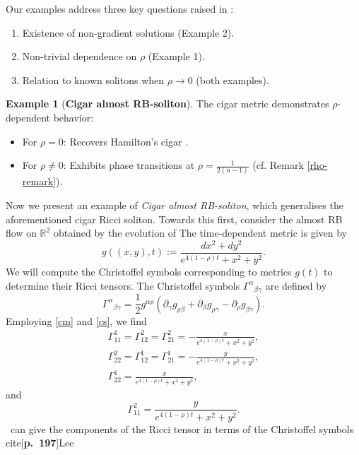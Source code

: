 \documentclass[a4paper, twoside, 10pt]{article}
\numberwithin{equation}{section}
\theoremstyle{definition}
\newtheorem{example}{Example}[section]
\begin{document}
Our examples address three key questions raised in \cite{feitosa2019gradient}:
\begin{enumerate}
    \item Existence of non-gradient solutions (Example 2).
    \item Non-trivial dependence on $\rho$ (Example 1).
    \item Relation to known solitons when $\rho\to 0$ (both examples).
\end{enumerate}

\smallskip

\begin{example}[{\bf Cigar almost RB-soliton}]\label{ex:cigar}
The cigar metric demonstrates $\rho$-dependent behavior:
\begin{itemize}
    \item For $\rho=0$: Recovers Hamilton's cigar \cite{PT}.
    \item For $\rho\neq0$: Exhibits phase transitions at $\rho = \frac{1}{2(n-1)}$ (cf. Remark \ref{rho-remark}).
\end{itemize}
Now we present an example of {\it Cigar almost RB-soliton}, which generalises the aforementioned cigar Ricci soliton. Towards this first, consider the  almost RB flow  on $\mathbb{R}^2$ obtained by the evolution of 
The time-dependent metric is given by 
     \begin{equation}\label{cm}
         g((x,y),t):=\frac{dx^2+dy^2}{e^{4(1-\rho)t}+x^2+y^2}.
     \end{equation}
We will compute the Christoffel symbols corresponding to metrics $g(t)$ to determine their Ricci tensors. The Christoffel symbols $\Gamma^\alpha{ }_{\beta \gamma}$ are defined by
     \begin{equation}\label{cs}
         \Gamma^\alpha{ }_{\beta \gamma}=\frac{1}{2} g^{\alpha \rho}\left(\partial_\gamma g_{\rho \beta}+\partial_\beta g_{\rho \gamma}-\partial_\rho g_{\beta \gamma}\right).
     \end{equation}
Employing  \eqref{cm} and \eqref{cs}, we find   
   $$  \begin{gathered}
\Gamma_{11}^1=\Gamma_{1 2}^2=\Gamma_{2 1}^2=-\frac{x}{e^{4(1-\rho) t}+x^2+y^2}, \\
\Gamma_{2 2}^2=\Gamma_{1 2}^1=\Gamma_{2 1}^1=-\frac{y}{e^{4(1-\rho) t}+x^2+y^2}, \\
\Gamma^{1 }_{2 2}=\frac{x}{e^{4 (1-\rho)t}+x^2+y^2},
\end{gathered}
$$
and $$\Gamma^{2 }_{1 1}=\frac{y}{e^{4 (1-\rho)t}+x^2+y^2}.$$
\ can give the components of the Ricci tensor in terms of the Christoffel symbols cite[{\bf p.~197}]{Lee}

\end{example}
\end{document}

